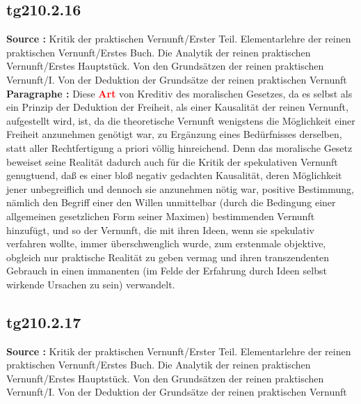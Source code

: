 \documentclass[a4paper,12pt,twoside]{book}
\newcommand{\match}[1]{\textcolor{red}{\textbf{#1}}}
\begin{document}
	\subsection*{tg210.2.16} 
	\textbf{Source : }Kritik der praktischen Vernunft/Erster Teil. Elementarlehre der reinen praktischen Vernunft/Erstes Buch. Die Analytik der reinen praktischen Vernunft/Erstes Hauptstück. Von den Grundsätzen der reinen praktischen Vernunft/I. Von der Deduktion der Grundsätze der reinen praktischen Vernunft\\  
	
	\noindent\textbf{Paragraphe : }Diese \match{Art} von Kreditiv des moralischen Gesetzes, da es selbst als ein Prinzip der Deduktion der Freiheit, als einer Kausalität der reinen Vernunft, aufgestellt wird, ist, da die theoretische Vernunft wenigstens die Möglichkeit einer Freiheit anzunehmen genötigt war, zu Ergänzung eines Bedürfnisses derselben, statt aller Rechtfertigung a priori völlig hinreichend. Denn das moralische Gesetz beweiset seine Realität dadurch auch für die Kritik der spekulativen Vernunft genugtuend, daß es einer bloß negativ gedachten Kausalität, deren Möglichkeit jener unbegreiflich und dennoch sie anzunehmen nötig war, positive Bestimmung, nämlich den Begriff einer den Willen unmittelbar (durch die Bedingung einer allgemeinen gesetzlichen Form seiner Maximen) bestimmenden Vernunft hinzufügt, und so der Vernunft, die mit ihren Ideen, wenn sie spekulativ verfahren wollte, immer überschwenglich wurde, zum erstenmale objektive, obgleich nur praktische Realität zu geben vermag und ihren transzendenten Gebrauch in einen immanenten (im Felde der Erfahrung durch Ideen selbst wirkende Ursachen zu sein) verwandelt. 
	
	\subsection*{tg210.2.17} 
	\textbf{Source : }Kritik der praktischen Vernunft/Erster Teil. Elementarlehre der reinen praktischen Vernunft/Erstes Buch. Die Analytik der reinen praktischen Vernunft/Erstes Hauptstück. Von den Grundsätzen der reinen praktischen Vernunft/I. Von der Deduktion der Grundsätze der reinen praktischen Vernunft\\  
	
\end{document}
